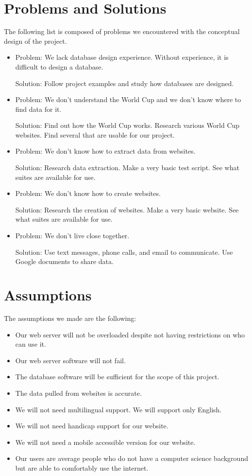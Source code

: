 \documentclass{article}
\begin{document}
\section{Problems and Solutions}
The following list is composed of problems we encountered with the conceptual design of the project.
\begin{itemize}
  \item 
  Problem: We lack database design experience. Without experience, it is difficult to design a database.
  
  Solution:  Follow project examples and study how databases are designed.
  \item 
  Problem: We don't understand the World Cup and we don't know where to find data for it.
  
  Solution: Find out how the World Cup works. Research various World Cup websites. Find several that are usable for our project.
  \item 
  Problem:  We don't know how to extract data from websites.
  
  Solution: Research data extraction. Make a very basic test script. See what suites are available for use.
   \item 
  Problem: We don't know how to create websites. 
    
  Solution: Research the creation of websites. Make a very basic website. See what suites are available for use.
  
  \item
  Problem: We don't live close together. 
    
  Solution: Use text messages, phone calls, and email to communicate. Use Google documents to share data.
\end{itemize}

\section{Assumptions}
The assumptions we made are the following:
\begin{itemize}
\item Our web server will not be overloaded despite not having restrictions on who can use it.
\item Our web server software will not fail.
\item The database software will be sufficient for the scope of this project.
\item The data pulled from websites is accurate.
\item We will not need multilingual support. We will support only English.
\item We will not need handicap support for our website.
\item We will not need a mobile accessible version for our website.
\item Our users are average people who do not have a computer science background but are able to comfortably use the internet.
\end{itemize}
\end{document}
